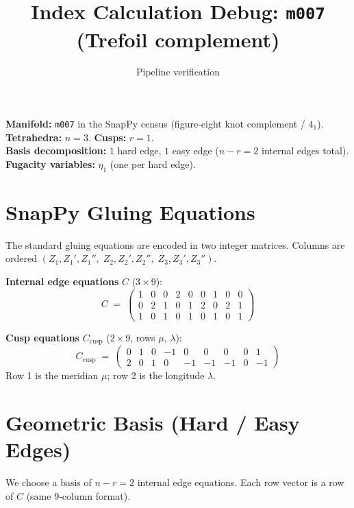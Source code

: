 \documentclass[11pt]{article}
\title{Index Calculation Debug: \texttt{m007} (Trefoil complement)}
\author{Pipeline verification}
\date{}
\begin{document}
\maketitle

\noindent
\textbf{Manifold:} \texttt{m007} in the SnapPy census (figure-eight knot complement / $4_1$).\\
\textbf{Tetrahedra:} $n=3$. \quad \textbf{Cusps:} $r=1$.\\
\textbf{Basis decomposition:} $1$ hard edge, $1$ easy edge ($n - r = 2$ internal edges total).\\
\textbf{Fugacity variables:} $\eta_1$ (one per hard edge).

\section{SnapPy Gluing Equations}

The standard gluing equations are encoded in two integer matrices.
Columns are ordered
$(Z_1, Z_1', Z_1'', \; Z_2, Z_2', Z_2'', \; Z_3, Z_3', Z_3'')$.

\bigskip
\noindent\textbf{Internal edge equations} $C$ ($3\times 9$):
\[
C \;=\;
\begin{pmatrix}
 1 & 0 & 0 & 2 & 0 & 0 & 1 & 0 & 0 \\
 0 & 2 & 1 & 0 & 1 & 2 & 0 & 2 & 1 \\
 1 & 0 & 1 & 0 & 1 & 0 & 1 & 0 & 1
\end{pmatrix}
\]

\noindent\textbf{Cusp equations} $C_{\mathrm{cusp}}$ ($2\times 9$, rows $\mu$, $\lambda$):
\[
C_{\mathrm{cusp}} \;=\;
\begin{pmatrix}
 0 &  1 &  0 & -1 &  0 &  0 &  0 &  0 &  1 \\[3pt]
 2 &  0 &  1 &  0 & -1 & -1 & -1 &  0 & -1
\end{pmatrix}
\]
Row 1 is the meridian $\mu$; row 2 is the longitude $\lambda$.

\section{Geometric Basis (Hard / Easy Edges)}

We choose a basis of $n - r = 2$ internal edge equations.
Each row vector is a row of $C$ (same $9$-column format).
\end{document}
